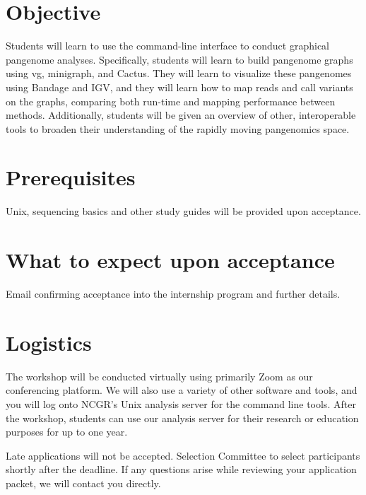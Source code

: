 \documentclass[
]{book}
\begin{document}
\hypertarget{objective}{%
\section*{Objective}\label{objective}}

Students will learn to use the command-line interface to conduct graphical pangenome analyses. Specifically, students will learn to build pangenome graphs using vg, minigraph, and Cactus. They will learn to visualize these pangenomes using Bandage and IGV, and they will learn how to map reads and call variants on the graphs, comparing both run-time and mapping performance between methods. Additionally, students will be given an overview of other, interoperable tools to broaden their understanding of the rapidly moving pangenomics space.

\hypertarget{prerequisites}{%
\section*{Prerequisites}\label{prerequisites}}

Unix, sequencing basics and other study guides will be provided upon acceptance.

\hypertarget{what-to-expect-upon-acceptance}{%
\section*{What to expect upon acceptance}\label{what-to-expect-upon-acceptance}}

Email confirming acceptance into the internship program and further details.

\hypertarget{logistics}{%
\section*{Logistics}\label{logistics}}

The workshop will be conducted virtually using primarily Zoom as our conferencing platform. We will also use a variety of other software and tools, and you will log onto NCGR's Unix analysis server for the command line tools. After the workshop, students can use our analysis server for their research or education purposes for up to one year.

Late applications will not be accepted. Selection Committee to select participants shortly after the deadline. If any questions arise while reviewing your application packet, we will contact you directly.
\end{document}

